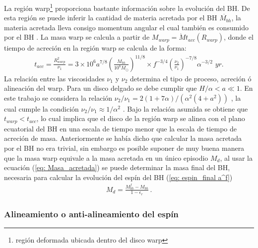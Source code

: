 La región warp\footnote{región deformada ubicada dentro del disco warp} proporciona bastante información sobre la evolución del BH. De esta región se puede inferir la cantidad de materia acretada por el BH $\dot{M_{bh}}$, la materia acretada lleva consigo momentum angular el cual también es consumido por el BH
\cite{volonteri2007}. La masa warp se calcula a partir de $M_{warp}=\dot{M}t_{acc}(R_{warp})$, donde el tiempo de acreción en la región warp se calcula de la forma:
%
\begin{align}
 t_{acc}=\frac{R^{2}_{warp}}{\nu_{1}} = 3 \times10^{6}a^{7/8} \left(\frac{M_{bh}}{10^{8}M_{\odot}} \right)^{11/8}\times f^{-3/4}\left( \frac{\nu_{2}}{\nu_{1}}\right)^{-7/8}\alpha^{-3/2}\,\, \textit{yr}.
\end{align}
%
La relación entre las viscosidades $\nu_1$ y $\nu_2$ determina el tipo de proceso, acreción ó alineación del warp. Para un disco delgado se debe cumplir que $H/\alpha < a \ll 1$. En este trabajo se considera la relación $\nu_{2}/\nu_{1}=2(1+7\alpha)/(\alpha^{2}(4+a^{2}))$ \cite{ogilvie1999} , la cual cumple la condición $\nu_{2}/\nu_{1}\approx 1/\alpha^{2}$ \cite{papaloizou1983}. Bajo la relación asumida se obtiene que $t_{warp}< t_{acc}$, lo cual implica que el disco de la región warp se alinea con el plano ecuatorial del BH en una escala de tiempo menor que la escala de tiempo de acreción de masa. Anteriormente se había dicho que calcular la masa acretada por el BH no era trivial, sin embargo es posible suponer de muy buena manera que la masa warp equivale a la masa acretada en un único episodio $M_{d}$, al usar la ecuación (\ref{eq: Masa_acretada}) \cite{Bustamante2018b} se puede determinar la masa final del BH, necesaria para calcular la evolución del espín del BH (\ref{eq: espin_final a^f})
%
\begin{align}
 M_{d}= \frac{M_{bh}^{f}-M_{bh}}{1-\epsilon_{r}}\,.
 \label{eq: Masa_acretada}
\end{align}
%
    \subsubsection{Alineamiento o anti-alineamiento del espín}
    \label{subsubsec: Aling_Spin}


